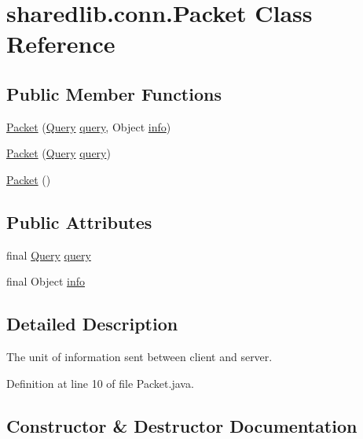 \hypertarget{classsharedlib_1_1conn_1_1_packet}{}\section{sharedlib.\+conn.\+Packet Class Reference}
\label{classsharedlib_1_1conn_1_1_packet}
\subsection*{Public Member Functions}
\begin{DoxyCompactItemize}
\item 
\hyperlink{classsharedlib_1_1conn_1_1_packet_a19bd4aaa5fa334a7bb09214b2d9df94a}{Packet} (\hyperlink{enumsharedlib_1_1conn_1_1_query}{Query} \hyperlink{classsharedlib_1_1conn_1_1_packet_a4e6ccf75df2c5db9dfbd4460b6f004c3}{query}, Object \hyperlink{classsharedlib_1_1conn_1_1_packet_aa2c7723583e1791e8b3a87a3a875245d}{info})
\item 
\hyperlink{classsharedlib_1_1conn_1_1_packet_a0d370b10ed28aad9468e986cc673c48b}{Packet} (\hyperlink{enumsharedlib_1_1conn_1_1_query}{Query} \hyperlink{classsharedlib_1_1conn_1_1_packet_a4e6ccf75df2c5db9dfbd4460b6f004c3}{query})
\item 
\hyperlink{classsharedlib_1_1conn_1_1_packet_ab897488a0373fc9f3143ac8016f03aba}{Packet} ()
\end{DoxyCompactItemize}
\subsection*{Public Attributes}
\begin{DoxyCompactItemize}
\item 
final \hyperlink{enumsharedlib_1_1conn_1_1_query}{Query} \hyperlink{classsharedlib_1_1conn_1_1_packet_a4e6ccf75df2c5db9dfbd4460b6f004c3}{query}
\item 
final Object \hyperlink{classsharedlib_1_1conn_1_1_packet_aa2c7723583e1791e8b3a87a3a875245d}{info}
\end{DoxyCompactItemize}


\subsection{Detailed Description}
The unit of information sent between client and server. 

Definition at line 10 of file Packet.\+java.



\subsection{Constructor \& Destructor Documentation}
\hypertarget{classsharedlib_1_1conn_1_1_packet_a19bd4aaa5fa334a7bb09214b2d9df94a}{}\label{classsharedlib_1_1conn_1_1_packet_a19bd4aaa5fa334a7bb09214b2d9df94a} 
